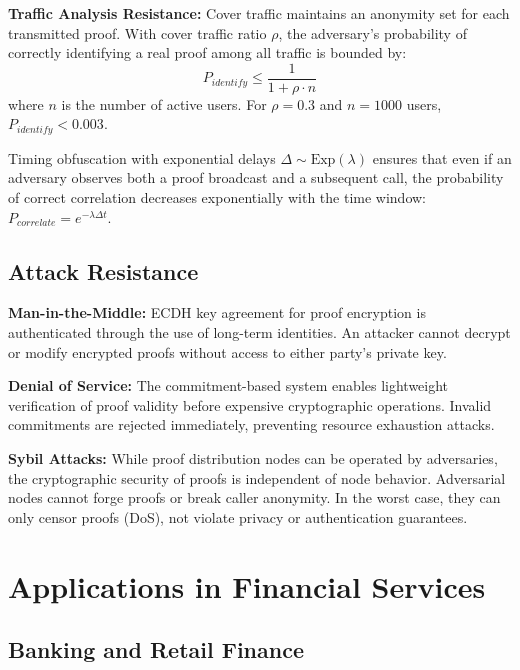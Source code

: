 \documentclass[11pt,twocolumn]{article}
\begin{document}
\textbf{Traffic Analysis Resistance:} Cover traffic maintains an anonymity set for each transmitted proof. With cover traffic ratio $\rho$, the adversary's probability of correctly identifying a real proof among all traffic is bounded by:
\begin{equation}
P_{identify} \leq \frac{1}{1 + \rho \cdot n}
\end{equation}
where $n$ is the number of active users. For $\rho = 0.3$ and $n = 1000$ users, $P_{identify} < 0.003$.

Timing obfuscation with exponential delays $\Delta \sim \text{Exp}(\lambda)$ ensures that even if an adversary observes both a proof broadcast and a subsequent call, the probability of correct correlation decreases exponentially with the time window: $P_{correlate} = e^{-\lambda \Delta t}$.

\subsection{Attack Resistance}

\textbf{Man-in-the-Middle:} ECDH key agreement for proof encryption is authenticated through the use of long-term identities. An attacker cannot decrypt or modify encrypted proofs without access to either party's private key.

\textbf{Denial of Service:} The commitment-based system enables lightweight verification of proof validity before expensive cryptographic operations. Invalid commitments are rejected immediately, preventing resource exhaustion attacks.

\textbf{Sybil Attacks:} While proof distribution nodes can be operated by adversaries, the cryptographic security of proofs is independent of node behavior. Adversarial nodes cannot forge proofs or break caller anonymity. In the worst case, they can only censor proofs (DoS), not violate privacy or authentication guarantees.

\section{Applications in Financial Services}

\subsection{Banking and Retail Finance}
\end{document}

